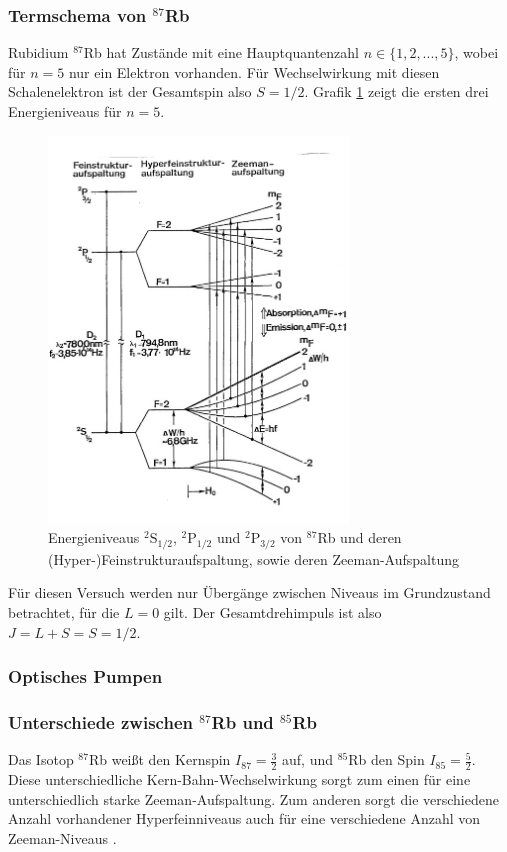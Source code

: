 \documentclass[../1-Grundlagenteil.tex]{subfiles}
\begin{document}
\subsubsection*{Termschema von $^{87}$Rb}
    Rubidium $^{87}$Rb hat Zustände mit eine Hauptquantenzahl $n\in\{1,2,...,5\}$, wobei für $n=5$ nur ein Elektron vorhanden. Für Wechselwirkung mit diesen Schalenelektron ist der Gesamtspin also $S=1/2$. Grafik \ref{fig:Rb87Termschema} zeigt die ersten drei Energieniveaus für $n=5$.

    \begin{figure}[H]
        \centering
        \includegraphics[width=8cm]{../../Bilddateien/Grundlagen/Rb87Termschema.jpg}
        \caption{Energieniveaus $^2\text{S}_{1/2}$, $^2\text{P}_{1/2}$ und $^2\text{P}_{3/2}$ von $^{87}$Rb und deren (Hyper-)Feinstrukturaufspaltung, sowie deren Zeeman-Aufspaltung \cite[p.171]{Schneider}}
        \label{fig:Rb87Termschema}
    \end{figure}

    Für diesen Versuch werden nur Übergänge zwischen Niveaus im Grundzustand betrachtet, für die $L=0$ gilt. Der Gesamtdrehimpuls ist also $J=L+S=S=1/2$.

\subsubsection*{Optisches Pumpen}
    
    
\subsubsection*{Unterschiede zwischen $^{87}$Rb und $^{85}$Rb}
    Das Isotop $^{87}$Rb weißt den Kernspin $I_{87}=\frac{3}{2}$ auf, und $^{85}$Rb den Spin $I_{85}=\frac{5}{2}$. Diese unterschiedliche Kern-Bahn-Wechselwirkung sorgt zum einen für eine unterschiedlich starke Zeeman-Aufspaltung. Zum anderen sorgt die verschiedene Anzahl vorhandener Hyperfeinniveaus auch für eine verschiedene Anzahl von Zeeman-Niveaus \cite[180]{Schneider}.
\end{document}
